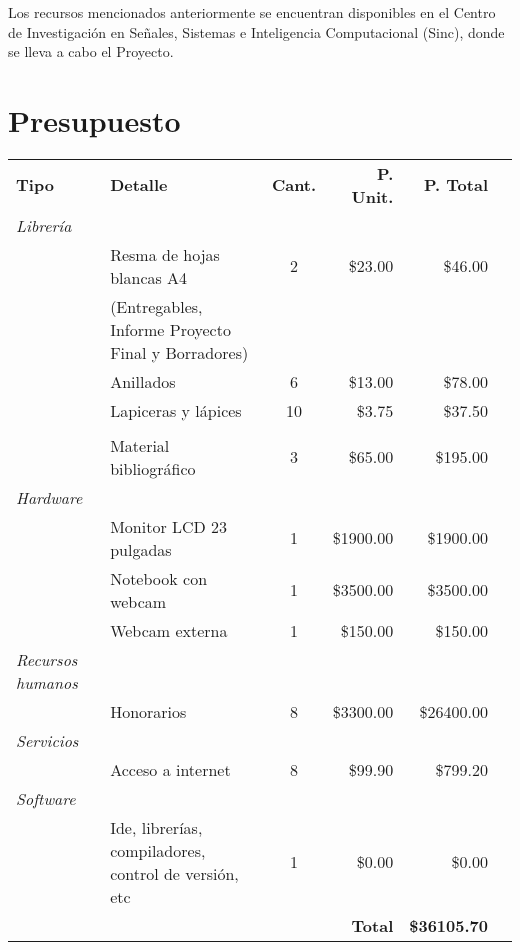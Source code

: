 \documentclass[a4paper,11pt,spanish]{article}
\begin{document}
Los recursos mencionados anteriormente se encuentran disponibles en el Centro de Investigación en Señales, Sistemas e Inteligencia Computacional (Sinc), donde se lleva a cabo el Proyecto.

\section{Presupuesto}

\begin{tabular}{p{3.3cm} p{5.5cm} c r r l}

	\rowcolor[gray]{0.70} \textbf{Tipo} & \textbf{Detalle} & \textbf{Cant.} & \textbf{P. Unit.} &  \textbf{P. Total}\\ 

	\rowcolor[gray]{0.93} \textit{Librería} & & & & \\ \multirow{5}{*}{} 
	& Resma de hojas blancas A4 & 2 & \$23.00 &\$46.00 \\
	& (Entregables, Informe Proyecto Final y Borradores)&  &  &  \\
	& Anillados & 6 & \$13.00 & \$78.00 \\
	& Lapiceras y lápices & 10 & \$3.75 & \$37.50 \\

	\rowcolor[gray]{0.93} \textit{Fotocopias} & & & & \\ \multirow{1}{*}{} 
	& Material bibliográfico & 3 & \$65.00 & \$195.00 \\	
	
	\rowcolor[gray]{0.93} \textit{Hardware}  & & & & \\ \multirow{3}{*}{} 
	& Monitor LCD 23 pulgadas & 1 & \$1900.00 & \$1900.00 \\      
	& Notebook con webcam & 1 & \$3500.00 & \$3500.00 \\
	& Webcam externa & 1 & \$150.00 & \$150.00 \\
	
	\rowcolor[gray]{0.93} \textit{Recursos humanos} & & & &\\ \multirow{1}{*}{}
	& Honorarios & 8 & \$3300.00 & \$26400.00\\
	        	
	\rowcolor[gray]{0.93} \textit{Servicios} & & & & \\ \multirow{1}{*}{}
	& Acceso a internet & 8 & \$99.90 & \$799.20 \\

	\rowcolor[gray]{0.93} \textit{Software} & & & & \\ \multirow{1}{*}{} 
	& Ide, librerías, compiladores, control de versión, etc & 1 & \$0.00 & \$0.00 \\	

	\rowcolor[gray]{0.70} & & & \textbf{Total} & \textbf{\$36105.70} \\

\end{tabular}
\end{document}
